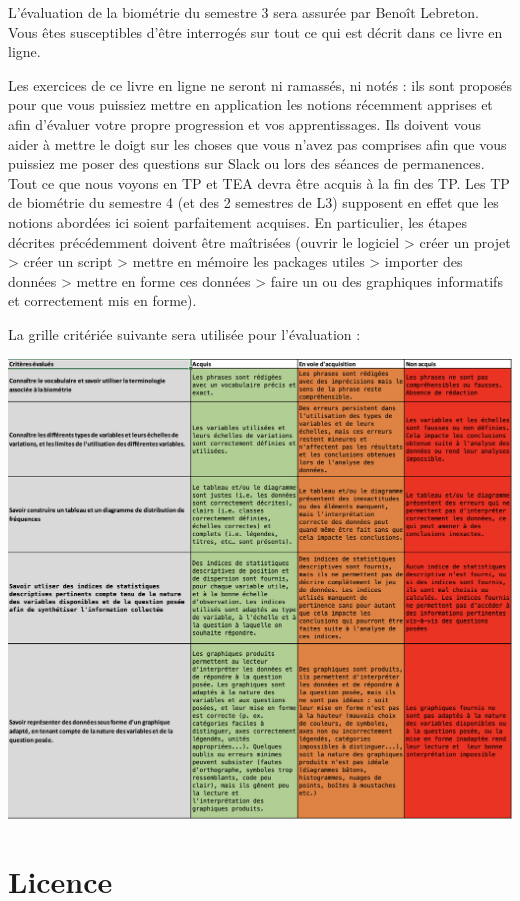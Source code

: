 \documentclass[
  a4paper,
  DIV=11,
  numbers=noendperiod,
  oneside]{scrreprt}
\begin{document}
L'évaluation de la biométrie du semestre 3 sera assurée par Benoît
Lebreton. Vous êtes susceptibles d'être interrogés sur tout ce qui est
décrit dans ce livre en ligne.

Les exercices de ce livre en ligne ne seront ni ramassés, ni notés : ils
sont proposés pour que vous puissiez mettre en application les notions
récemment apprises et afin d'évaluer votre propre progression et vos
apprentissages. Ils doivent vous aider à mettre le doigt sur les choses
que vous n'avez pas comprises afin que vous puissiez me poser des
questions sur Slack ou lors des séances de permanences. Tout ce que nous
voyons en TP et TEA devra être acquis à la fin des TP. Les TP de
biométrie du semestre 4 (et des 2 semestres de L3) supposent en effet
que les notions abordées ici soient parfaitement acquises. En
particulier, les étapes décrites précédemment doivent être maîtrisées
(ouvrir le logiciel \textgreater{} créer un projet \textgreater{} créer
un script \textgreater{} mettre en mémoire les packages utiles
\textgreater{} importer des données \textgreater{} mettre en forme ces
données \textgreater{} faire un ou des graphiques informatifs et
correctement mis en forme).

La grille critériée suivante sera utilisée pour l'évaluation :

\includegraphics{images/Grille.png}

\section*{Licence}\label{licence}
\end{document}
